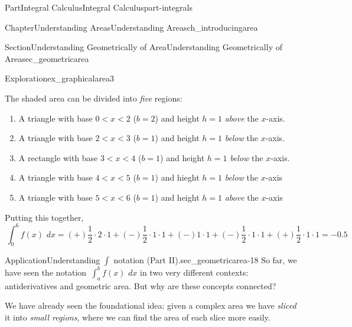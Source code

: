 \documentclass{tufte-book}
\numberwithin{equation}{chapter}
\newcommand{\intdx}[1]{{\,\int#1\,\,dx}}
\newcommand{\lt}{<}
\begin{document}
\begin{partptx}{Part}{Integral Calculus}{}{Integral Calculus}{}{}{part-integrals}
\begin{chapterptx}{Chapter}{Understanding Areas}{}{Understanding Areas}{}{}{ch_introducingarea}
\begin{sectionptx}{Section}{Understanding Geometrically of Area}{}{Understanding Geometrically of Area}{}{}{sec_geometricarea}
\begin{exploration}{Exploration}{}{ex_graphicalarea3}
\begin{enumerate}[font=\bfseries,label=(\alph*),ref=\alph*]
\begin{image}{0.25}{0.5}{0.25}{}
{
}%
\end{image}%
The shaded area can be divided into \emph{five} regions:%
\begin{enumerate}
\item{}A  triangle with base \(0\lt x\lt 2\) (\(b=2\)) and height \(h=1\) \emph{above} the \(x\)-axis.%
\item{}A triangle with base \(2\lt x\lt 3\) (\(b=1\)) and height \(h=1\) \emph{below} the \(x\)-axis.%
\item{}A rectangle with base \(3\lt x\lt 4\) (\(b=1\)) and height \(h=1\) \emph{below} the \(x\)-axis.%
\item{}A triangle with base \(4\lt x\lt 5\) (\(b=1\)) and hieght \(h=1\) \emph{below} the \(x\)-axis%
\item{}A triangle with base \(5\lt x\lt 6\) (\(b=1\)) and height \(h=1\) \emph{above} the \(x\)-axis%
\end{enumerate}
Putting this together,%
\begin{equation*}
\intdx{_0^6 f(x) } = (+) \frac{1}{2}\cdot 2 \cdot 1 + (-)\frac{1}{2}\cdot 1 \cdot 1 + (-)1\cdot 1 + (-)\frac{1}{2}\cdot 1\cdot 1 + (+)\frac{1}{2}\cdot 1 \cdot 1  = -0.5
\end{equation*}
%
\end{enumerate}%
\end{exploration}%
\begin{insight}{Application}{Understanding \(\int\) notation (Part II).}{sec_geometricarea-18}%
So far, we have seen the notation \(\intdx{_a^b f(x)}\) in two very different contexts: antiderivatives and geometric area. But why are these concepts connected?%
\par
We have already seen the foundational idea: given a complex area we have \emph{sliced} it into \emph{small regions}, where we can find the area of each slice more easily.%

\end{insight}
\end{sectionptx}
\end{chapterptx}
\end{partptx}
\end{document}
